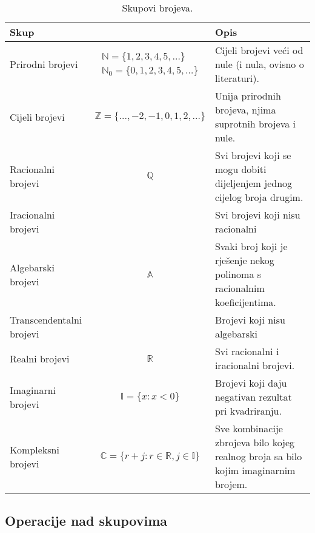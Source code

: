 \begin{table}[ht]
    \center
    \begin{tabular}{l c p{5cm}}
    \hline
    Skup & & Opis \\ \hline \hline

    Prirodni brojevi\index{Prirodni brojevi} &
    $
    \begin{array}{c}
        \mathbb{N} = \{1, 2, 3, 4, 5, \dots\} \\
        \mathbb{N}_0 = \{0, 1, 2, 3, 4, 5, \dots\}
    \end{array}
    $ &
    Cijeli brojevi veći od nule (i nula, ovisno o literaturi). \\ \hline

    Cijeli brojevi &
    $
    \mathbb{Z} = \{..., -2, -1, 0, 1, 2, ...\}
    $ &
    Unija prirodnih brojeva, njima suprotnih brojeva i nule. \\ \hline

    Racionalni brojevi &
    $\mathbb{Q}$ &
    Svi brojevi koji se mogu dobiti dijeljenjem jednog cijelog broja drugim. \\ \hline

    Iracionalni brojevi & &
    Svi brojevi koji nisu racionalni \\ \hline

    Algebarski brojevi &
    $\mathbb{A}$ &
    Svaki broj koji je rješenje nekog polinoma s racionalnim koeficijentima. \\ \hline

    Transcendentalni brojevi & &
    Brojevi koji nisu algebarski \\ \hline

    Realni brojevi &
    $\mathbb{R}$ &
    Svi racionalni i iracionalni brojevi. \\ \hline

    Imaginarni brojevi &
    $
    \mathbb{I} = \{x: x < 0\}
    $ &
    Brojevi koji daju negativan rezultat pri kvadriranju. \\ \hline

    Kompleksni brojevi &
    $
    \mathbb{C} = \{r + j: r \in \mathbb{R}, j \in \mathbb{I}\}
    $ &
    Sve kombinacije zbrojeva bilo kojeg realnog broja sa bilo kojim imaginarnim brojem. \\ \hline
    \end{tabular}
    \caption{\label{tab:table-name} Skupovi brojeva.}
\end{table}
\newpage

\subsection{Operacije nad skupovima}

